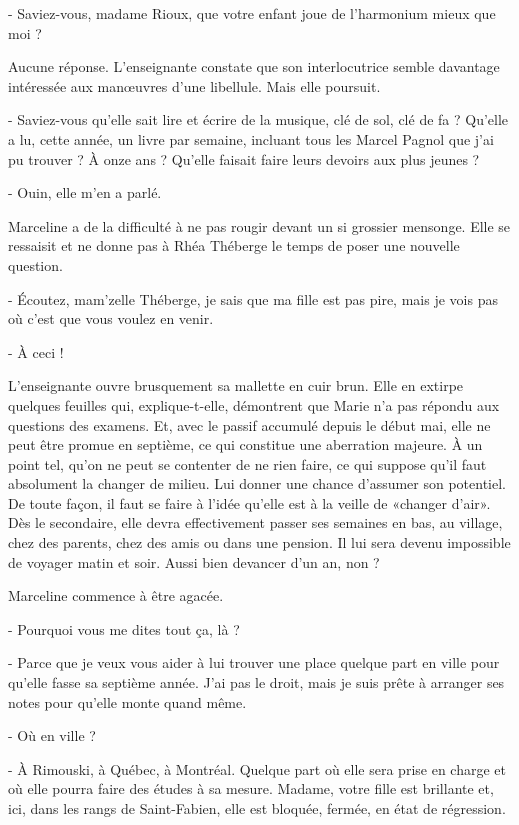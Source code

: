 - Saviez-vous, madame Rioux, que votre enfant joue de l’harmonium mieux que moi ?

Aucune réponse. L’enseignante constate que son interlocutrice semble davantage intéressée aux manœuvres d’une libellule. Mais elle poursuit.

- Saviez-vous qu’elle sait lire et écrire de la musique, clé de sol, clé de fa ? Qu’elle a lu, cette année, un livre par semaine, incluant tous les Marcel Pagnol que j’ai pu trouver ? À onze ans ? Qu’elle faisait faire leurs devoirs aux plus jeunes ?

- Ouin, elle m’en a parlé.

Marceline a de la difficulté à ne pas rougir devant un si grossier mensonge. Elle se ressaisit et ne donne pas à Rhéa Théberge le temps de poser une nouvelle question.

- Écoutez, mam’zelle Théberge, je sais que ma fille est pas pire, mais je vois pas où c’est que vous voulez en venir.

- À ceci !

L’enseignante ouvre brusquement sa mallette en cuir brun. Elle en extirpe quelques feuilles qui, explique-t-elle, démontrent que Marie n’a pas répondu aux questions des examens. Et, avec le passif accumulé depuis le début mai, elle ne peut être promue en septième, ce qui constitue une aberration majeure. À un point tel, qu’on ne peut se contenter de ne rien faire, ce qui suppose qu’il faut absolument la changer de milieu. Lui donner une chance d’assumer son potentiel. De toute façon, il faut se faire à l’idée qu’elle est à la veille de «changer d’air». Dès le secondaire, elle devra effectivement passer ses semaines en bas, au village, chez des parents, chez des amis ou dans une pension. Il lui sera devenu impossible de voyager matin et soir. Aussi bien devancer d’un an, non ?

Marceline commence à être agacée.

- Pourquoi vous me dites tout ça, là ?

- Parce que je veux vous aider à lui trouver une place quelque part en ville pour qu’elle fasse sa septième année. J’ai pas le droit, mais je suis prête à arranger ses notes pour qu’elle monte quand même.

- Où en ville ?

- À Rimouski, à Québec, à Montréal. Quelque part où elle sera prise en charge et où elle pourra faire des études à sa mesure. Madame, votre fille est brillante et, ici, dans les rangs de Saint-Fabien, elle est bloquée, fermée, en état de régression.

